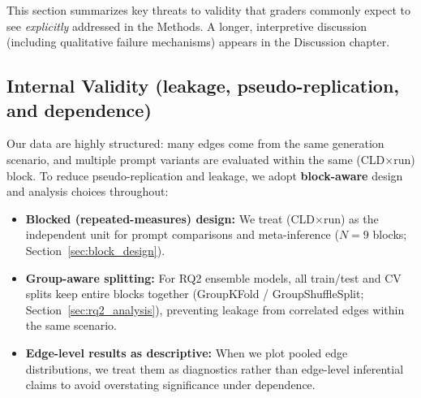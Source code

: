 This section summarizes key threats to validity that graders commonly expect to see \emph{explicitly} addressed in the Methods. A longer, interpretive discussion (including qualitative failure mechanisms) appears in the Discussion chapter.

\subsection{Internal Validity (leakage, pseudo-replication, and dependence)}
Our data are highly structured: many edges come from the same generation scenario, and multiple prompt variants are evaluated within the same (CLD$\times$run) block. To reduce pseudo-replication and leakage, we adopt \textbf{block-aware} design and analysis choices throughout:
\begin{itemize}[noitemsep]
    \item \textbf{Blocked (repeated-measures) design:} We treat (CLD$\times$run) as the independent unit for prompt comparisons and meta-inference ($N=9$ blocks; Section~\ref{sec:block_design}).
    \item \textbf{Group-aware splitting:} For RQ2 ensemble models, all train/test and CV splits keep entire blocks together (GroupKFold / GroupShuffleSplit; Section~\ref{sec:rq2_analysis}), preventing leakage from correlated edges within the same scenario.
    \item \textbf{Edge-level results as descriptive:} When we plot pooled edge distributions, we treat them as diagnostics rather than edge-level inferential claims to avoid overstating significance under dependence.
\end{itemize}

